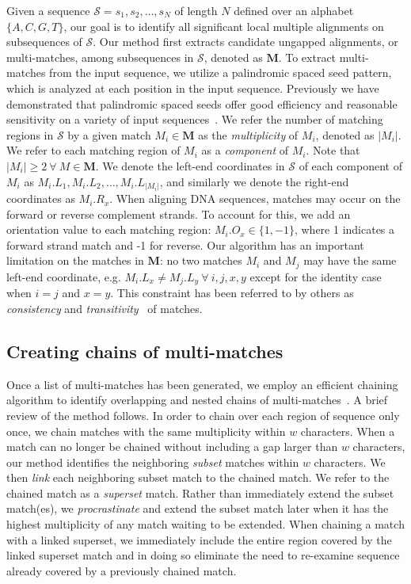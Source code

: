 \documentclass{ws-procs975x65}
\begin{document}
Given a sequence $\mathcal{S}=s_1, s_2,\dots, s_N$ of length $N$
defined over an alphabet $\{A,C,G,T\}$, our goal is to identify all
significant local multiple alignments on subsequences of $\mathcal{S}$. Our
method first extracts candidate ungapped alignments, or multi-matches,
among subsequences in $\mathcal{S}$, denoted as $\mathbf{M}$. To extract multi-matches from the input sequence, we utilize a palindromic spaced seed pattern, which is analyzed at each position in the input sequence.  Previously we have demonstrated that palindromic spaced seeds offer good efficiency and reasonable sensitivity on a variety of input sequences~\cite{ref-procrast}.
We refer the number of matching regions in $\mathcal{S}$
by a given match $M_i \in \mathbf{M}$ as the
\textit{multiplicity} of $M_i$, denoted as $|M_i|$. We refer to each
matching region of $M_i$ as a \textit{component} of $M_i$. Note that
$|M_i| \geq 2~\forall~M \in \mathbf{M}$.  We denote the left-end
coordinates in $\mathcal{S}$ of each component of $M_i$ as $M_i.L_1,
M_i.L_2,\dots, M_i.L_{|M_i|}$, and similarly we denote the right-end
coordinates as $M_i.R_x$.  When aligning DNA sequences, matches may
occur on the forward or reverse complement strands. To account for
this, we add an orientation value to each matching region:
$M_i.O_x \in \{1,-1\}$, where 1 indicates a forward strand match and
-1 for reverse. Our algorithm has an important limitation on the matches in
$\mathbf{M}$: no two matches $M_i$ and $M_j$ may have the same
left-end coordinate, e.g. $M_i.L_x \neq M_j.L_y~\forall~i, j, x, y$
except for the identity case when $i=j$ and $x=y$.  This constraint
has been referred to by others as \textit{consistency} and
\textit{transitivity}~\cite{ref-transitivity} of matches.

\subsection{Creating chains of multi-matches}

Once a list of multi-matches has been generated, we employ an efficient chaining algorithm to identify overlapping and nested chains of multi-matches~\cite{ref-procrast}. A brief review of the method follows.
In order to chain over each region of sequence only once,
we chain matches with the same multiplicity within $w$
characters. When a match can no
longer be chained without including a gap larger than $w$
characters, our method identifies the neighboring \textit{subset}
matches within $w$ characters. We then \textit{link} each
neighboring subset match to the chained match. We refer to the
chained match as a \textit{superset} match. Rather than immediately
extend the subset match(es), we \textit{procrastinate} and extend
the subset match later when it has the highest multiplicity of any
match waiting to be extended. When chaining a match with a linked
superset, we immediately include the entire region covered by the linked superset
match and in doing so eliminate the need to re-examine sequence already covered by
a previously chained match.
\end{document}
